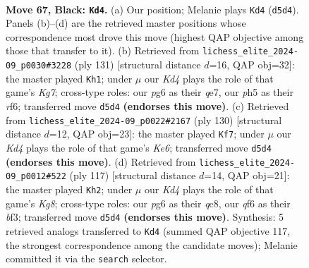 \documentclass[11pt]{article}
\begin{document}
\clearpage

\begin{figure}[p]\centering
\begin{subfigure}{0.46\textwidth}\centering
\resizebox{\linewidth}{!}{%
\newchessgame
\chessboard[
  setfen={8/8/5QP1/3kP2P/1r6/8/2K5/8 b - - 2 67},
  showmover=false,
  pgfstyle=straightmove, color=movearrow, markmove={d5-d4}
]}
\caption{}
\end{subfigure}\hfill
\begin{subfigure}{0.46\textwidth}\centering
\resizebox{\linewidth}{!}{%
\newchessgame
\chessboard[
  setfen={8/4Q3/5R2/2K5/5P2/6P1/6kP/8 b - - 6 66},
  showmover=false,
  pgfstyle=straightmove, color=movearrow, markmove={g2-h1}
]}
\caption{}
\end{subfigure}
\\[4pt]
\begin{subfigure}{0.46\textwidth}\centering
\resizebox{\linewidth}{!}{%
\newchessgame
\chessboard[
  setfen={8/8/4K1pk/5p2/6q1/8/8/8 w - - 2 66},
  showmover=false,
  pgfstyle=straightmove, color=movearrow, markmove={e6-f7}
]}
\caption{}
\end{subfigure}\hfill
\begin{subfigure}{0.46\textwidth}\centering
\resizebox{\linewidth}{!}{%
\newchessgame
\chessboard[
  setfen={2Q5/8/3K4/8/8/5B1P/6P1/6k1 b - - 0 59},
  showmover=false,
  pgfstyle=straightmove, color=movearrow, markmove={g1-h2}
]}
\caption{}
\end{subfigure}
\caption{\textbf{Move 67, Black: \texttt{Kd4}.} (a) Our position; Melanie plays \texttt{Kd4} (\texttt{d5d4}). Panels (b)--(d) are the retrieved master positions whose correspondence most drove this move (highest QAP objective among those that transfer to it). (b) Retrieved from \texttt{lichess\_elite\_2024-09\_p0030\#3228} (ply 131) [structural distance $d$=16, QAP obj=32]: the master played \texttt{Kh1}; under $\mu$ our \emph{Kd4} plays the role of that game's \emph{Kg7}; cross-type roles: our \emph{p}g6 as their \emph{q}e7, our \emph{p}h5 as their \emph{r}f6; transferred move \texttt{d5d4} \textbf{(endorses this move)}. (c) Retrieved from \texttt{lichess\_elite\_2024-09\_p0022\#2167} (ply 130) [structural distance $d$=12, QAP obj=23]: the master played \texttt{Kf7}; under $\mu$ our \emph{Kd4} plays the role of that game's \emph{Ke6}; transferred move \texttt{d5d4} \textbf{(endorses this move)}. (d) Retrieved from \texttt{lichess\_elite\_2024-09\_p0012\#522} (ply 117) [structural distance $d$=14, QAP obj=21]: the master played \texttt{Kh2}; under $\mu$ our \emph{Kd4} plays the role of that game's \emph{Kg8}; cross-type roles: our \emph{p}g6 as their \emph{q}c8, our \emph{q}f6 as their \emph{b}f3; transferred move \texttt{d5d4} \textbf{(endorses this move)}. Synthesis: 5 retrieved analogs transferred to \texttt{Kd4} (summed QAP objective 117, the strongest correspondence among the candidate moves); Melanie committed it via the \texttt{search} selector.}
\label{fig:thought-m133}
\end{figure}
\end{document}
